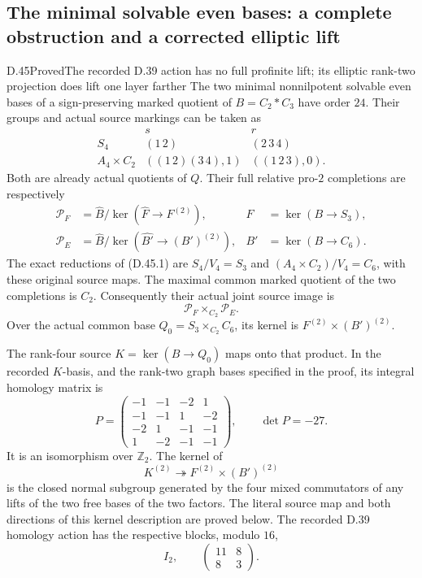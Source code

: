 \subsection{The minimal solvable even bases: a complete obstruction and a corrected elliptic lift}

\begin{statement}{D.45}{Proved}{The recorded D.39 action has no full profinite lift; its elliptic rank-two projection does lift one layer farther}
The two minimal nonnilpotent solvable even bases of a
sign-preserving marked quotient of \(B=C_2*C_3\) have order
\(24\). Their groups and actual source markings can be taken as
\[
 \begin{array}{c|cc}
       &s&r\\ \hline
 S_4&(1\,2)&(2\,3\,4)\\
 A_4\times C_2&((1\,2)(3\,4),1)&((1\,2\,3),0).
 \end{array}                                                   \tag{D.45.1}
\]
Both are already actual quotients of \(Q\).
Their full relative pro-\(2\) completions are respectively
\[
 \begin{aligned}
 \mathcal P_F&=\widehat B/
          \ker(\widehat F\to F^{(2)}),&
 F&=\ker(B\to S_3),\\
 \mathcal P_E&=\widehat B/
          \ker(\widehat {B'}\to (B')^{(2)}),&
 B'&=\ker(B\to C_6).
 \end{aligned}                                                 \tag{D.45.2}
\]
The exact reductions of (D.45.1) are \(S_4/V_4=S_3\)
and \((A_4\times C_2)/V_4=C_6\), with these original
source maps. The maximal common marked quotient of the
two completions is \(C_2\). Consequently their actual
joint source image is
\[
       \mathcal P_F\times_{C_2}\mathcal P_E.                    \tag{D.45.3}
\]
Over the actual common base
\(Q_0=S_3\times_{C_2}C_6\), its kernel is
\(F^{(2)}\times(B')^{(2)}\).

The rank-four source \(K=\ker(B\to Q_0)\) maps onto
that product. In the recorded \(K\)-basis, and the
rank-two graph bases specified in the proof, its integral
homology matrix is
\[
 P=\begin{pmatrix}
 -1&-1&-2&1\\
 -1&-1&1&-2\\
 -2&1&-1&-1\\
 1&-2&-1&-1
 \end{pmatrix},\qquad \det P=-27.                              \tag{D.45.4}
\]
It is an isomorphism over \(\mathbb Z_2\). The kernel of
\[
                  K^{(2)}\twoheadrightarrow
                      F^{(2)}\times(B')^{(2)}                  \tag{D.45.5}
\]
is the closed normal subgroup generated by the four
mixed commutators of any lifts of the two free bases
of the two factors. The literal source map and both
directions of this kernel description are proved below.
The recorded D.39 homology action has the respective
blocks, modulo \(16\),
\[
                 I_2,\qquad
                    \begin{pmatrix}11&8\\8&3\end{pmatrix}.    \tag{D.45.6}
\]


\end{statement}
